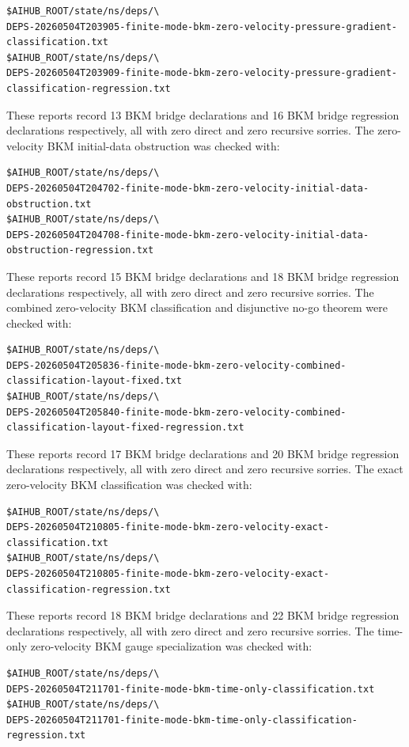 \documentclass[11pt]{article}
\begin{document}
\begin{verbatim}
$AIHUB_ROOT/state/ns/deps/\
DEPS-20260504T203905-finite-mode-bkm-zero-velocity-pressure-gradient-classification.txt
$AIHUB_ROOT/state/ns/deps/\
DEPS-20260504T203909-finite-mode-bkm-zero-velocity-pressure-gradient-classification-regression.txt
\end{verbatim}
These reports record 13 BKM bridge declarations and 16 BKM bridge regression
declarations respectively, all with zero direct and zero recursive sorries.
The zero-velocity BKM initial-data obstruction was checked with:
\begin{verbatim}
$AIHUB_ROOT/state/ns/deps/\
DEPS-20260504T204702-finite-mode-bkm-zero-velocity-initial-data-obstruction.txt
$AIHUB_ROOT/state/ns/deps/\
DEPS-20260504T204708-finite-mode-bkm-zero-velocity-initial-data-obstruction-regression.txt
\end{verbatim}
These reports record 15 BKM bridge declarations and 18 BKM bridge regression
declarations respectively, all with zero direct and zero recursive sorries.
The combined zero-velocity BKM classification and disjunctive no-go theorem
were checked with:
\begin{verbatim}
$AIHUB_ROOT/state/ns/deps/\
DEPS-20260504T205836-finite-mode-bkm-zero-velocity-combined-classification-layout-fixed.txt
$AIHUB_ROOT/state/ns/deps/\
DEPS-20260504T205840-finite-mode-bkm-zero-velocity-combined-classification-layout-fixed-regression.txt
\end{verbatim}
These reports record 17 BKM bridge declarations and 20 BKM bridge regression
declarations respectively, all with zero direct and zero recursive sorries.
The exact zero-velocity BKM classification was checked with:
\begin{verbatim}
$AIHUB_ROOT/state/ns/deps/\
DEPS-20260504T210805-finite-mode-bkm-zero-velocity-exact-classification.txt
$AIHUB_ROOT/state/ns/deps/\
DEPS-20260504T210805-finite-mode-bkm-zero-velocity-exact-classification-regression.txt
\end{verbatim}
These reports record 18 BKM bridge declarations and 22 BKM bridge regression
declarations respectively, all with zero direct and zero recursive sorries.
The time-only zero-velocity BKM gauge specialization was checked with:
\begin{verbatim}
$AIHUB_ROOT/state/ns/deps/\
DEPS-20260504T211701-finite-mode-bkm-time-only-classification.txt
$AIHUB_ROOT/state/ns/deps/\
DEPS-20260504T211701-finite-mode-bkm-time-only-classification-regression.txt
\end{verbatim}
\end{document}

